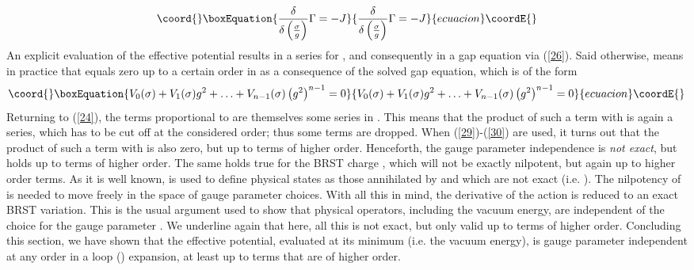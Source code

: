 \documentclass[a4paper,12pt]{article}
\providecommand{\text}{\textrm}
\begin{document}
\begin{equation}\coord{}\boxEquation{  \label{29}
\frac{\delta}{\delta\left(\frac{\sigma}{g}\right)}\Gamma=-J
}{  \frac{\delta}{\delta\left(\frac{\sigma}{g}\right)}\Gamma=-J
}{ecuacion}\coordE{}\end{equation}
An explicit evaluation of the effective potential results in a series for \coordHE{}, and consequently in a gap equation via (\ref{26}). Said otherwise, \coordHE{} means in practice that \coordHE{} equals zero up to a certain order in \coordHE{} as a consequence of the solved gap equation, which is of the form
\begin{equation}\coord{}\boxEquation{  \label{30}
V_{0}(\sigma)+V_{1}(\sigma)g^{2}+\ldots+V_{n-1}(\sigma)\left(g^{2}
\right)^{n-1}=0
}{  V_{0}(\sigma)+V_{1}(\sigma)g^{2}+\ldots+V_{n-1}(\sigma)\left(g^{2}
\right)^{n-1}=0
}{ecuacion}\coordE{}\end{equation}
Returning to (\ref{24}), the terms proportional to \coordHE{} are themselves some
series in \coordHE{}. This means that the product of such a term with \coordHE{} is
again a series, which has to be cut off at the considered order; thus some
terms are dropped. When (\ref{29})-(\ref{30}) are used, it turns out that
the product of such a term with \coordHE{} is also zero, but up to terms of higher
order. Henceforth, the gauge parameter independence is \emph{not exact}, but
holds up to terms of higher order. The same holds true for the BRST charge \coordHE{}, which will not be exactly nilpotent, but again up to higher order
terms. As it is well known, \coordHE{} is used to define physical states as
those annihilated by \coordHE{} and which are not exact (i.e. \myHighlight{$\neq
Q_{BRST}\left|\text{something}\right\rangle$}\coordHE{}). The nilpotency of \coordHE{}
is needed to move freely in the space of gauge parameter choices. With all
this in mind, the \myHighlight{$\alpha$}\coordHE{} derivative of the action is reduced to an exact
BRST variation. This is the usual argument used to show that physical
operators, including the vacuum energy, are independent of the choice for
the gauge parameter \myHighlight{$\alpha$}\coordHE{} \cite{book}. We underline again that here, all
this is not exact, but only valid up to terms of higher order. \newline
\newline
Concluding this section, we have shown that the effective potential,
evaluated at its minimum (i.e. the vacuum energy), is gauge parameter
independent at any order in a loop (\coordHE{}) expansion, at least up to terms
that are of higher order.
\end{document}
